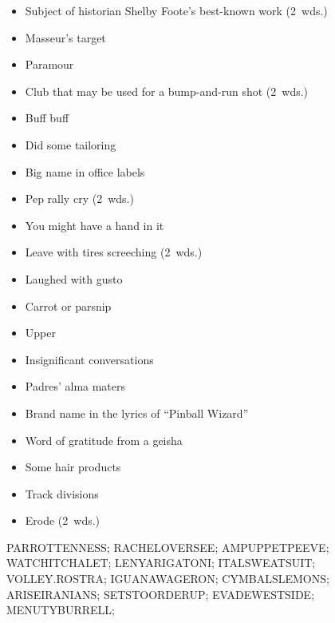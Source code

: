 {\begin{itemize}
      \item
        Subject of historian Shelby Foote's best-known work (2~wds.)
    \end{itemize}
  \item
    \begin{itemize}
      \item
        Masseur's target
      \item
        Paramour
      \item
        Club that may be used for a bump-and-run shot (2~wds.)
      \item
        Buff buff
      \item
        Did some tailoring
      \item
        Big name in office labels
      \item
        Pep rally cry (2~wds.)
    \end{itemize}
  \item
    \begin{itemize}
      \item
        You might have a hand in it
      \item
        Leave with tires screeching (2~wds.)
      \item
        Laughed with gusto
      \item
        Carrot or parsnip
      \item
        Upper
    \end{itemize}
  \item
    \begin{itemize}
      \item
        Insignificant conversations
      \item
        Padres' alma maters
      \item
        Brand name in the lyrics of ``Pinball Wizard''
    \end{itemize}
  \item
    \begin{itemize}
      \item
        Word of gratitude from a geisha
      \item
        Some hair products
      \item
        Track divisions
    \end{itemize}
  \item
    \begin{itemize}
      \item
        Erode (2~wds.)
    \end{itemize}
}{%
  \puzzlerow PARROTTENNESS;
  \puzzlerow RACHELOVERSEE;
  \puzzlerow AMPUPPETPEEVE;
  \puzzlerow WATCHITCHALET;
  \puzzlerow LENYARIGATONI;
  \puzzlerow ITALSWEATSUIT;
  \puzzlerow VOLLEY.ROSTRA;
  \puzzlerow IGUANAWAGERON;
  \puzzlerow CYMBALSLEMONS;
  \puzzlerow ARISEIRANIANS;
  \puzzlerow SETSTOORDERUP;
  \puzzlerow EVADEWESTSIDE;
  \puzzlerow MENUTYBURRELL;
}

